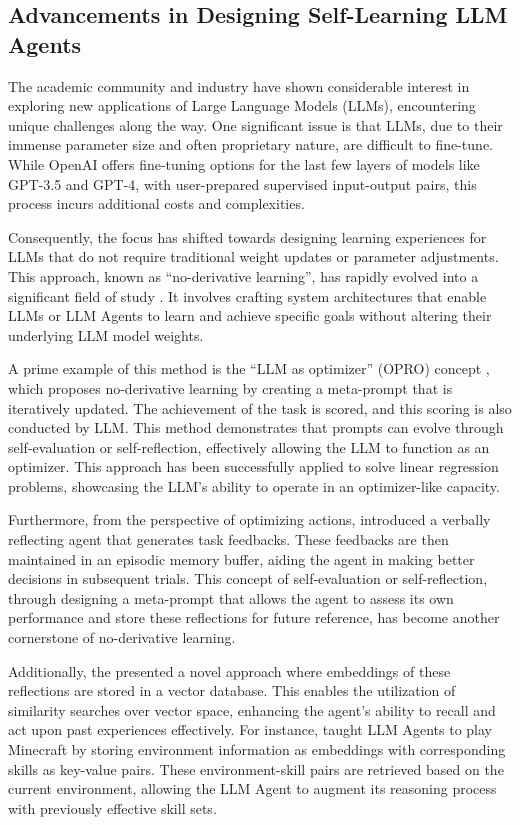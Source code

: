 \documentclass[15pt,letterpaper]{article}
\begin{document}
\subsection{Advancements in Designing Self-Learning LLM Agents}\label{llm-agent-lit}

The academic community and industry have shown considerable interest 
in exploring new applications of Large Language Models (LLMs), 
encountering unique challenges along the way. 
One significant issue is that LLMs, due to their immense parameter size 
and often proprietary nature, are difficult to fine-tune. 
While OpenAI offers fine-tuning options for the last few layers of models like GPT-3.5 and GPT-4, with user-prepared supervised input-output pairs, this process incurs additional costs and complexities.

Consequently, the focus has shifted towards designing learning experiences 
for LLMs that do not require traditional weight updates or parameter adjustments. 
This approach, known as ``no-derivative learning'', 
has rapidly evolved into a significant field of study \citep{yang2023large, zhu2023ghost, wang2023voyager}. 
It involves crafting system architectures that enable LLMs or LLM Agents to learn and achieve specific goals without altering their underlying LLM model weights.

A prime example of this method is the ``LLM as optimizer'' (OPRO) concept \citep{yang2023large}, which proposes no-derivative learning by creating a meta-prompt that is iteratively updated. The achievement of the task is scored, and this scoring is also conducted by LLM. This method demonstrates that prompts can evolve through self-evaluation or self-reflection, effectively allowing the LLM to function as an optimizer. This approach has been successfully applied to solve linear regression problems, showcasing the LLM's ability to operate in an optimizer-like capacity.

Furthermore, from the perspective of optimizing actions, \cite{shinn2023reflexion} introduced a verbally reflecting agent that generates task feedbacks. These feedbacks are then maintained in an episodic memory buffer, aiding the agent in making better decisions in subsequent trials. This concept of self-evaluation or self-reflection, through designing a meta-prompt that allows the agent to assess its own performance and store these reflections for future reference, has become another cornerstone of no-derivative learning.

Additionally, the \cite{wang2023voyager} presented a novel approach where embeddings of these reflections are stored in a vector database. 
This enables the utilization of similarity searches over vector space, enhancing the agent's ability to recall and act upon past experiences effectively. For instance, \cite{wang2023voyager} taught LLM Agents to play Minecraft by storing environment information as embeddings with corresponding skills as key-value pairs. These environment-skill pairs are retrieved based on the current environment, allowing the LLM Agent to augment its reasoning process with previously effective skill sets.
\end{document}
